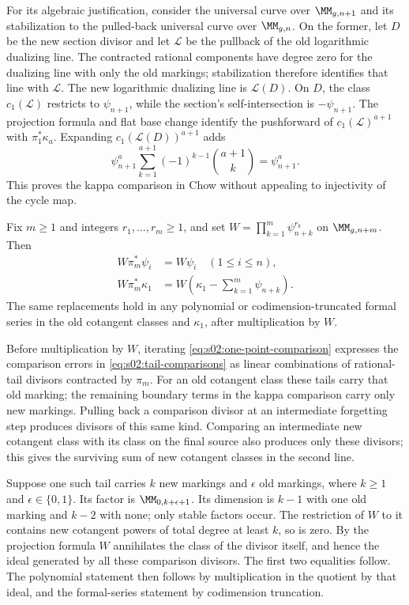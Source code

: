 For its algebraic justification, consider the universal curve over
$\MM_{g,n+1}$ and its stabilization to the pulled-back universal
curve over $\MM_{g,n}$.  On the former, let $D$ be the new section
divisor and let $\mathcal L$ be the pullback of the old logarithmic
dualizing line.  The contracted rational components have degree zero
for the dualizing line with only the old markings; stabilization
therefore identifies that line with $\mathcal L$.  The new
logarithmic dualizing line is $\mathcal L(D)$.  On $D$, the class
$c_1(\mathcal L)$ restricts to $\psi_{n+1}$, while the section's
self-intersection is $-\psi_{n+1}$.  The projection formula and flat
base change identify the pushforward of $c_1(\mathcal L)^{a+1}$
with $\pi_1^*\kappa_a$.  Expanding $c_1(\mathcal L(D))^{a+1}$ adds
\[
\psi_{n+1}^a\sum_{k=1}^{a+1}(-1)^{k-1}\binom{a+1}{k}
=\psi_{n+1}^a.
\]
This proves the kappa comparison in Chow without appealing to
injectivity of the cycle map.

\begin{lmm}
\label{lmm:s02:rational-tail-degree}
Fix $m\geq1$ and integers $r_1,\ldots,r_m\geq1$, and set
$W=\prod_{k=1}^m\psi_{n+k}^{r_k}$ on $\MM_{g,n+m}$.  Then
\begin{equation}
\label{eq:s02:tail-comparisons}
\begin{split}
W\pi_m^*\psi_i&=W\psi_i\quad(1\leq i\leq n),\\
W\pi_m^*\kappa_1
&=W\left(\kappa_1-\sum_{k=1}^m\psi_{n+k}\right).
\end{split}
\end{equation}
The same replacements hold in any polynomial or codimension-truncated
formal series in the old cotangent classes and $\kappa_1$, after
multiplication by $W$.
\end{lmm}

\begin{prf}
Before multiplication by $W$, iterating
\eqref{eq:s02:one-point-comparison} expresses the comparison errors
in \eqref{eq:s02:tail-comparisons} as linear combinations of
rational-tail divisors contracted by $\pi_m$.  For an old cotangent
class these tails carry that old marking; the remaining boundary
terms in the kappa comparison carry only new markings.  Pulling back a comparison
divisor at an intermediate forgetting step produces divisors of this
same kind.  Comparing an intermediate new cotangent class with its
class on the final source also produces only these divisors; this
gives the surviving sum of new cotangent classes in the second line.

Suppose one such tail carries $k$ new markings and $\epsilon$ old
markings, where $k\geq1$ and $\epsilon\in\{0,1\}$.  Its factor is
$\MM_{0,k+\epsilon+1}$.  Its dimension is $k-1$ with one old
marking and $k-2$ with none; only stable factors occur.  The
restriction of $W$ to it contains
new cotangent powers of total degree at least $k$, so is zero.
By the projection formula $W$ annihilates the class of the divisor
itself, and hence the ideal generated by all these comparison
divisors.  The first two equalities follow.  The polynomial statement
then follows by multiplication in the quotient by that ideal, and the
formal-series statement by codimension truncation.
\end{prf}

